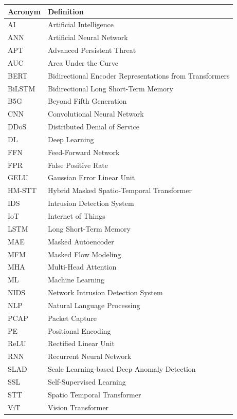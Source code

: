 \documentclass[12pt, a4paper]{report}
\begin{document}
\begin{longtable}{@{}p{2.5cm}p{12cm}@{}}
\toprule
\textbf{Acronym} & \textbf{Definition} \\
\midrule
\endhead

AI & Artificial Intelligence \\
ANN & Artificial Neural Network \\
APT &  Advanced Persistent Threat \\
AUC & Area Under the Curve \\
BERT & Bidirectional Encoder Representations from Transformers \\
BiLSTM & Bidirectional Long Short-Term Memory \\
B5G & Beyond Fifth Generation\\
CNN & Convolutional Neural Network \\
DDoS & Distributed Denial of Service \\
DL & Deep Learning \\
FFN & Feed-Forward Network \\
FPR & False Positive Rate \\
GELU & Gaussian Error Linear Unit \\
HM-STT & Hybrid Masked Spatio-Temporal Transformer \\
IDS & Intrusion Detection System \\
IoT & Internet of Things \\
LSTM & Long Short-Term Memory \\
MAE & Masked Autoencoder \\
MFM & Masked Flow Modeling \\
MHA & Multi-Head Attention \\
ML & Machine Learning \\
NIDS & Network Intrusion Detection System \\
NLP & Natural Language Processing \\
PCAP & Packet Capture \\
PE & Positional Encoding \\
ReLU & Rectified Linear Unit \\
RNN & Recurrent Neural Network \\
SLAD & Scale Learning-based Deep Anomaly Detection \\
SSL & Self-Supervised Learning \\
STT  & Spatio Temporal Transformer \\
ViT & Vision Transformer \\

\bottomrule
\end{longtable}
\end{document}
